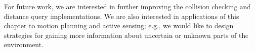 For future work, we are interested in further improving the collision
checking and distance query implementations. We are also interested in
applications of this chapter to motion planning and active sensing; e.g., we would like
to design strategies for gaining more information about uncertain or
unknown parts of the environment.




